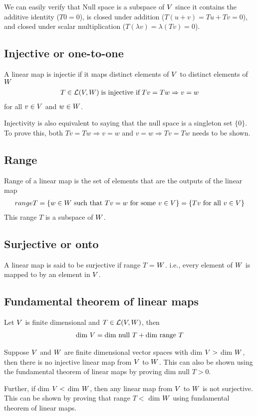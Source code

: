 \documentclass[../../linear_algebra.tex]{subfiles}
\begin{document}
We can easily verify that Null space is a subspace of $V$ since it contains the additive identity ($T0 = 0$), is closed under addition ($T(u + v) = Tu + Tv = 0$), and closed under scalar multiplication ($T(\lambda v) = \lambda(Tv) = 0$).


\subsection{Injective or one-to-one}
A linear map is injectie if it maps distinct elements of $V$ to distinct elements of $W$
\begin{align*}
    T \in \mathcal{L}(V, W) \; \text{is injective if} \; Tv = Tw \Rightarrow v = w
\end{align*}
for all $v \in V$ and $w \in W$.\newline

Injectivity is also equivalent to saying that the null space is a singleton set $\{0 \}$. To prove this, both $Tv = Tw \Rightarrow v = w$ and $v = w \Rightarrow Tv = Tw$ needs to be shown.


\subsection{Range}
Range of a linear map is the set of elements that are the outputs of the linear map
\begin{align*}
    range T = \{ w \in W \text{ such that } Tv = w \text{ for some } v \in V\} = \{ Tv \text{ for all } v \in V \}
\end{align*}
This range $T$ is a subspace of $W$.


\subsection{Surjective or onto}
A linear map is said to be surjective if range $T$ = $W$. i.e., every element of $W$ is mapped to by an element in $V$.

\subsection{Fundamental theorem of linear maps}
Let $V$ is finite dimensional and $T \in \mathcal{L}(V, W)$, then
\begin{align*}
    \text{dim } V = \text{dim null } T + \text{dim range } T 
\end{align*}

Suppose $V$ and $W$ are finite dimensional vector spaces with dim $V >$ dim $W$, then there is no injective linear map from $V$ to $W$. This can also be shown using the fundamental theorem of linear maps by proving dim null $T > 0$.\newline

Further, if dim $V < $ dim $W$, then any linear map from $V$ to $W$ is not surjective. This can be shown by proving that range $T <$ dim $W$ using fundamental theorem of linear maps.
\end{document}
